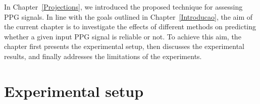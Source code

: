 
%



In Chapter~\ref{Projections}, we introduced the proposed technique for assessing \gls{PPG} signals. In line with the goals outlined in Chapter~\ref{Introducao}, the aim of the current chapter is to investigate the effects of different methods on predicting whether a given input \gls{PPG} signal is reliable or not. To achieve this aim, the chapter first presents the experimental setup, then discusses the experimental results, and finally addresses the limitations of the experiments.



\section{Experimental setup}


